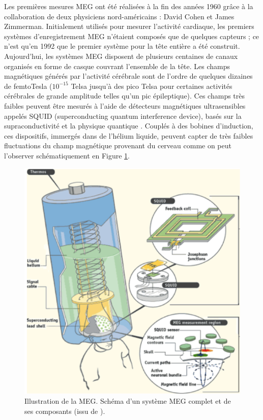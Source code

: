 \vspace{2ex}
Les premières mesures MEG ont été réalisées à la fin des années 1960 grâce à la collaboration de deux physiciens nord-américains : David Cohen et James Zimmerman. Initialement utilisés pour mesurer l'activité cardiaque, les premiers systèmes d'enregistrement MEG n'étaient composés que de quelques capteurs ; ce n'est qu'en 1992 que le premier système pour la tête entière a été construit. Aujourd'hui, les systèmes MEG disposent de plusieurs centaines de canaux organisés en forme de casque couvrant l'ensemble de la tête. Les champs magnétiques générés par l'activité cérébrale sont de l'ordre de quelques dizaines de femtoTesla ($10^{-15}$ Telsa jusqu'à des pico Telsa pour certaines activités cérébrales de grande amplitude telles qu'un pic épileptique). Ces champs très faibles peuvent être mesurés à l'aide de détecteurs magnétiques ultrasensibles appelés SQUID (superconducting quantum interference device), basés sur la supraconductivité et la physique quantique \cite{6}. Couplés à des bobines d'induction, ces dispositifs, immergés dans de l'hélium liquide, peuvent capter de très faibles fluctuations du champ magnétique provenant du cerveau comme on peut l'observer schématiquement en Figure \ref{fig1.3}. 

\begin{figure}[!ht]
    \centering
    \includegraphics[width=15cm]{fonctionnement_meg.png}
    \caption{Illustration de la MEG. Schéma d'un système MEG complet et de ses composants (issu de \cite{5}).}
    \label{fig1.3}
\end{figure}


